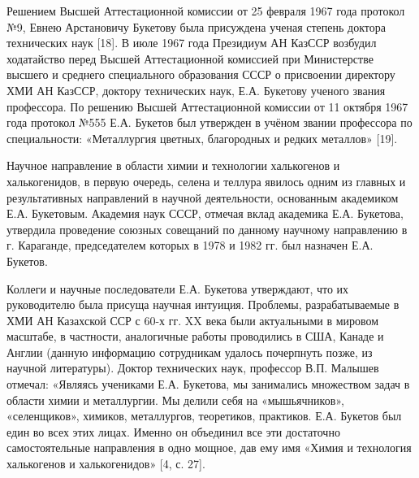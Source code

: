 \begin{multicols}{2}
Решением Высшей Аттестационной комиссии от 25 февраля 1967 года протокол
№9, Евнею Арстановичу Букетову была присуждена ученая степень доктора
технических наук {[}18{]}. В июле 1967 года Президиум АН КазССР возбудил
ходатайство перед Высшей Аттестационной комиссией при Министерстве
высшего и среднего специального образования СССР о присвоении директору
ХМИ АН КазССР, доктору технических наук, Е.А. Букетову ученого звания
профессора. По решению Высшей Аттестационной комиссии от 11 октября 1967
года протокол №555 Е.А. Букетов был утвержден в учёном звании профессора
по специальности: «Металлургия цветных, благородных и редких металлов»
{[}19{]}.

Научное направление в области химии и технологии халькогенов и
халькогенидов, в первую очередь, селена и теллура явилось одним из
главных и результативных направлений в научной деятельности, основанным
академиком Е.А. Букетовым. Академия наук СССР, отмечая вклад академика
Е.А. Букетова, утвердила проведение союзных совещаний по данному
научному направлению в г. Караганде, председателем которых в 1978 и 1982
гг. был назначен Е.А. Букетов.

Коллеги и научные последователи Е.А. Букетова утверждают, что их
руководителю была присуща научная интуиция. Проблемы, разрабатываемые в
ХМИ АН Казахской ССР с 60-х гг. XX века были актуальными в мировом
масштабе, в частности, аналогичные работы проводились в США, Канаде и
Англии (данную информацию сотрудникам удалось почерпнуть позже, из
научной литературы). Доктор технических наук, профессор В.П. Малышев
отмечал: «Являясь учениками Е.А. Букетова, мы занимались множеством
задач в области химии и металлургии. Мы делили себя на «мышьячников»,
«селенщиков», химиков, металлургов, теоретиков, практиков. Е.А. Букетов
был един во всех этих лицах. Именно он объединил все эти достаточно
самостоятельные направления в одно мощное, дав ему имя «Химия и
технология халькогенов и халькогенидов» {[}4, с. 27{]}.


\end{multicols}
